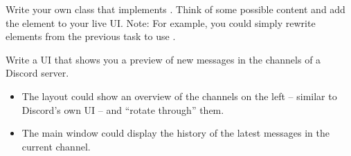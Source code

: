\documentclass{config/minimal_uebungszettel}
\theoremstyle{definition}
\newcommand{\pp}[1]{\lpl{#1}}
\begin{document}
\begin{aufg}[Rich]
	\noindent Write your own class that implements \pp{__rich__}. Think of some possible content and add the element to your live UI.\newline
	Note: For example, you could simply rewrite elements from the previous task to use \pp{__rich__}.
	
	\medskip
	\medskip
	
	\noindent {} \quad
	
	\noindent Write a UI that shows you a preview of new messages in the channels of a Discord server.
	\begin{itemize}
		\item The layout could show an overview of the channels on the left -- similar to Discord’s own UI -- and “rotate through” them.
		\item The main window could display the history of the latest messages in the current channel.
	\end{itemize}
	
\end{aufg}

	
\end{document}
